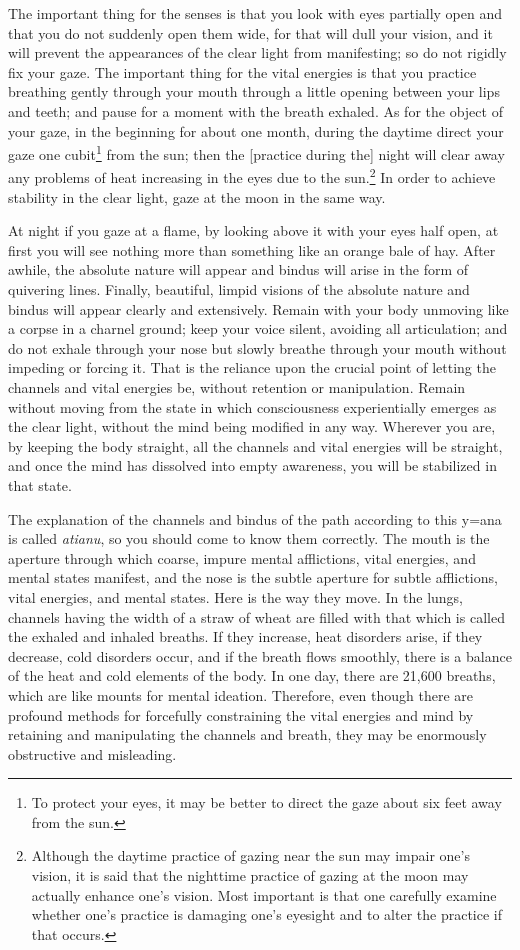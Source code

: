\documentclass[11pt,twocolumn]{article}
\begin{document}
The important thing for the senses is that you look with eyes
partially open and that you do not suddenly open them wide, for that
will dull your vision, and it will prevent the appearances of the
clear light from manifesting; so do not rigidly fix your gaze. The
important thing for the vital energies is that you practice breathing
gently through your mouth through a little opening between your lips
and teeth; and pause for a moment with the breath exhaled. As for the
object of your gaze, in the beginning for about one month, during the
daytime direct your gaze one cubit\footnote{To protect your eyes, it
  may be better to direct the gaze about six feet away from the sun.}
from the sun; then the [practice during the] night will clear away any
problems of heat increasing in the eyes due to the
sun.\footnote{Although the daytime practice of gazing near the sun may
  impair one's vision, it is said that the nighttime practice of
  gazing at the moon may actually enhance one's vision. Most important
  is that one carefully examine whether one's practice is damaging
  one's eyesight and to alter the practice if that occurs.} In order
to achieve stability in the clear light, gaze at the moon in the same
way.

At night if you gaze at a flame, by looking above it with your eyes
half open, at first you will see nothing more than something like an
orange bale of hay. After awhile, the absolute nature will appear and
bindus will arise in the form of quivering lines. Finally, beautiful,
limpid visions of the absolute nature and bindus will appear clearly
and extensively. Remain with your body unmoving like a corpse in a
charnel ground; keep your voice silent, avoiding all articulation; and
do not exhale through your nose but slowly breathe through your mouth
without impeding or forcing it. That is the reliance upon the crucial
point of letting the channels and vital energies be, without retention
or manipulation. Remain without moving from the state in which
consciousness experientially emerges as the clear light, without the
mind being modified in any way. Wherever you are, by keeping the body
straight, all the channels and vital energies will be straight, and
once the mind has dissolved into empty awareness, you will be
stabilized in that state.

The explanation of the channels and bindus of the path according to
this y\a={a}na is called \emph{ati\-anu}, so you should come to know
them correctly. The mouth is the aperture through which coarse, impure
mental afflictions, vital energies, and mental states manifest, and
the nose is the subtle aperture for subtle afflictions, vital
energies, and mental states. Here is the way they move. In the lungs,
channels having the width of a straw of wheat are filled with that
which is called the exhaled and inhaled breaths. If they increase,
heat disorders arise, if they decrease, cold disorders occur, and if
the breath flows smoothly, there is a balance of the heat and cold
elements of the body. In one day, there are 21,600 breaths, which are
like mounts for mental ideation. Therefore, even though there are
profound methods for forcefully constraining the vital energies and
mind by retaining and manipulating the channels and breath, they may
be enormously obstructive and misleading.
\end{document}
